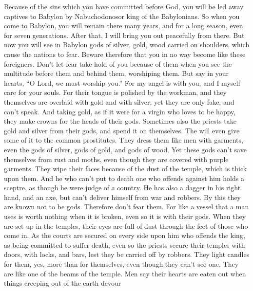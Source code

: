  Because of the sins which you have committed before God,
you will be led away captives to Babylon by Nabuchodonosor king of the
Babylonians.  So when you come to Babylon, you will remain
there many years, and for a long season, even for seven generations.
After that, I will bring you out peacefully from there. 
But now you will see in Babylon gods of silver, gold, wood carried on
shoulders, which cause the nations to fear.  Beware
therefore that you in no way become like these foreigners. Don't let
fear take hold of you because of them when you see the multitude before
them and behind them, worshiping them.  But say in your
hearts, ``O Lord, we must worship you.''  For my angel is
with you, and I myself care for your souls.  For their
tongue is polished by the workman, and they themselves are overlaid with
gold and with silver; yet they are only fake, and can't speak.
 And taking gold, as if it were for a virgin who loves to
be happy, they make crowns for the heads of their gods. 
Sometimes also the priests take gold and silver from their gods, and
spend it on themselves.  The will even give some of it to
the common prostitutes. They dress them like men with garments, even the
gods of silver, gods of gold, and gods of wood.  Yet
these gods can't save themselves from rust and moths, even though they
are covered with purple garments.  They wipe their faces
because of the dust of the temple, which is thick upon them.
 And he who can't put to death one who offends against
him holds a sceptre, as though he were judge of a country.
 He has also a dagger in his right hand, and an axe, but
can't deliver himself from war and robbers.  By this they
are known not to be gods. Therefore don't fear them.  For
like a vessel that a man uses is worth nothing when it is broken, even
so it is with their gods. When they are set up in the temples, their
eyes are full of dust through the feet of those who come in.
 As the courts are secured on every side upon him who
offends the king, as being committed to suffer death, even so the
priests secure their temples with doors, with locks, and bars, lest they
be carried off by robbers.  They light candles for them,
yes, more than for themselves, even though they can't see one.
 They are like one of the beams of the temple. Men say
their hearts are eaten out when things creeping out of the earth devour
